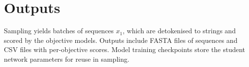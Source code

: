 \section*{Outputs}
Sampling yields batches of sequences \(x_1\), which are detokenised to strings and scored by the objective models. Outputs include FASTA files of sequences and CSV files with per-objective scores. Model training checkpoints store the student network parameters for reuse in sampling.

